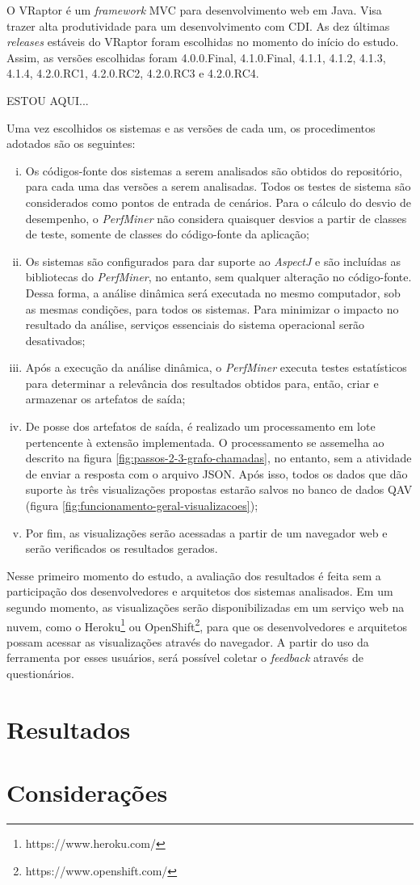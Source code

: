 O VRaptor é um \textit{framework} MVC para desenvolvimento web em Java. Visa trazer alta produtividade para um desenvolvimento com CDI. As dez últimas \textit{releases} estáveis do VRaptor foram escolhidas no momento do início do estudo. Assim, as versões escolhidas foram 4.0.0.Final, 4.1.0.Final, 4.1.1, 4.1.2, 4.1.3, 4.1.4, 4.2.0.RC1, 4.2.0.RC2, 4.2.0.RC3 e 4.2.0.RC4.

{\color{red}ESTOU AQUI...}

Uma vez escolhidos os sistemas e as versões de cada um, os procedimentos adotados são os seguintes:
\begin{enumerate}[(i)]
	\item Os códigos-fonte dos sistemas a serem analisados são obtidos do repositório, para cada uma das versões a serem analisadas. Todos os testes de sistema são considerados como pontos de entrada de cenários. Para o cálculo do desvio de desempenho, o \textit{PerfMiner} não considera quaisquer desvios a partir de classes de teste, somente de classes do código-fonte da aplicação;
	\item Os sistemas são configurados para dar suporte ao \textit{AspectJ} e são incluídas as bibliotecas do \textit{PerfMiner}, no entanto, sem qualquer alteração no código-fonte. Dessa forma, a análise dinâmica será executada no mesmo computador, sob as mesmas condições, para todos os sistemas. Para minimizar o impacto no resultado da análise, serviços essenciais do sistema operacional serão desativados;
	\item Após a execução da análise dinâmica, o \textit{PerfMiner} executa testes estatísticos para determinar a relevância dos resultados obtidos para, então, criar e armazenar os artefatos de saída;
	\item De posse dos artefatos de saída, é realizado um processamento em lote pertencente à extensão implementada. O processamento se assemelha ao descrito na figura \ref{fig:passos-2-3-grafo-chamadas}, no entanto, sem a atividade de enviar a resposta com o arquivo JSON. Após isso, todos os dados que dão suporte às três visualizações propostas estarão salvos no banco de dados QAV (figura \ref{fig:funcionamento-geral-visualizacoes});
	\item Por fim, as visualizações serão acessadas a partir de um navegador web e serão verificados os resultados gerados.
\end{enumerate}

Nesse primeiro momento do estudo, a avaliação dos resultados é feita sem a participação dos desenvolvedores e arquitetos dos sistemas analisados. Em um segundo momento, as visualizações serão disponibilizadas em um serviço web na nuvem, como o Heroku\footnote{https://www.heroku.com/} ou OpenShift\footnote{https://www.openshift.com/}, para que os desenvolvedores e arquitetos possam acessar as visualizações através do navegador. A partir do uso da ferramenta por esses usuários, será possível coletar o \textit{feedback} através de questionários.

\section{Resultados} \label{sec:avaliacao-resultados}
\section{Considerações} \label{sec:avaliacao-consideracoes}